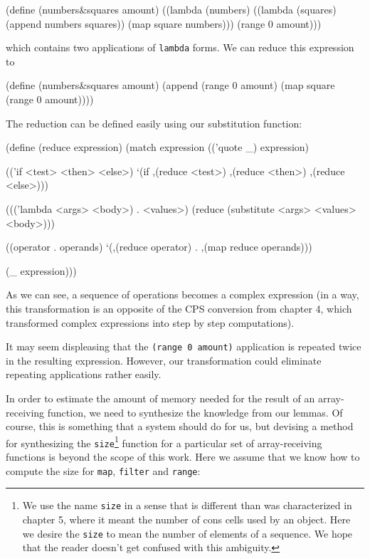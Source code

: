 \begin{Snippet}
  (define (numbers&squares amount)
    ((lambda (numbers)
       ((lambda (squares)
          (append numbers squares))
        (map square numbers)))
     (range 0 amount)))
\end{Snippet}

which contains two applications of \texttt{lambda} forms. We can reduce
this expression to

\begin{Snippet}
  (define (numbers&squares amount)
    (append (range 0 amount) (map square (range 0 amount))))
\end{Snippet}

The reduction can be defined easily using our substitution function:

\begin{Snippet}
  (define (reduce expression)
    (match expression
      (('quote _)
       expression)
\end{Snippet}
\begin{Snippet}
      (('if <test> <then> <else>)
       `(if ,(reduce <test>)
            ,(reduce <then>)
            ,(reduce <else>)))
\end{Snippet}
\begin{Snippet}
      ((('lambda <args> <body>) . <values>)
       (reduce (substitute <args> <values> <body>)))
\end{Snippet}
\begin{Snippet}
      ((operator . operands)
       `(,(reduce operator) . ,(map reduce operands)))
\end{Snippet}
\begin{Snippet}
      (_
       expression)))
\end{Snippet}

As we can see, a sequence of operations becomes a complex expression
(in a way, this transformation is an opposite of the CPS conversion
from chapter 4, which transformed complex expressions into step by step
computations).

It may seem displeasing that the \texttt{(range 0 amount)} application
is repeated twice in the resulting expression. However, our transformation
could eliminate repeating applications rather easily.

In order to estimate the amount of memory needed for the result of an
array-receiving function, we need to synthesize the knowledge from our
lemmas. Of course, this is something that a system should do for us,
but devising a method for synthesizing the \texttt{size}\footnote{
  We use the name \texttt{size} in a sense that is different than
  was characterized in chapter 5, where it meant the number of cons
  cells used by an object. Here we desire the \texttt{size} to mean
  the number of elements of a sequence. We hope that the reader
  doesn't get confused with this ambiguity.
}
function for a particular set of array-receiving functions is beyond
the scope of this work. Here we assume that we know how to compute
the size for \texttt{map}, \texttt{filter} and \texttt{range}\label{size}:

